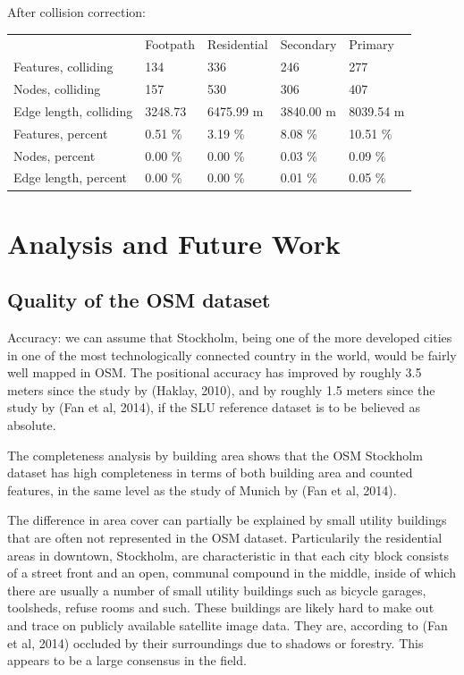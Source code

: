 \documentclass[a4paper]{article}
\begin{document}
After collision correction:

\begin{table}[H]
\begin{tabular}{lllll}
                            & Footpath      & Residential  & Secondary   & Primary     \\
    Features, colliding     & 134           & 336          & 246         & 277         \\
    Nodes, colliding        & 157           & 530          & 306         & 407         \\
    Edge length, colliding  & 3248.73       & 6475.99 m    & 3840.00 m   & 8039.54 m   \\
    Features, percent       & 0.51 \%       & 3.19 \%      & 8.08 \%     & 10.51 \%    \\
    Nodes, percent          & 0.00 \%       & 0.00 \%      & 0.03 \%     & 0.09 \%     \\
    Edge length, percent    & 0.00 \%       & 0.00 \%      & 0.01 \%     & 0.05 \%

\end{tabular}
\end{table}

\section{Analysis and Future Work}

\subsection{Quality of the OSM dataset}

Accuracy: we can assume that Stockholm, being one of the more developed cities in one of the most technologically connected country in the world, would be fairly well mapped in OSM. The positional accuracy has improved by roughly 3.5 meters since the study by (Haklay, 2010), and by roughly 1.5 meters since the study by (Fan et al, 2014), if the SLU reference dataset is to be believed as absolute.

The completeness analysis by building area shows that the OSM Stockholm dataset has high completeness in terms of both building area and counted features, in the same level as the study of Munich by (Fan et al, 2014).

The difference in area cover can partially be explained by small utility buildings that are often not represented in the OSM dataset. Particularily the residential areas in downtown, Stockholm, are characteristic in that each city block consists of a street front and an open, communal compound in the middle, inside of which there are usually a number of small utility buildings such as bicycle garages, toolsheds, refuse rooms and such. These buildings are likely hard to make out and trace on publicly available satellite image data. They are, according to (Fan et al, 2014) occluded by their surroundings due to shadows or forestry. This appears to be a large consensus in the field.
\end{document}
